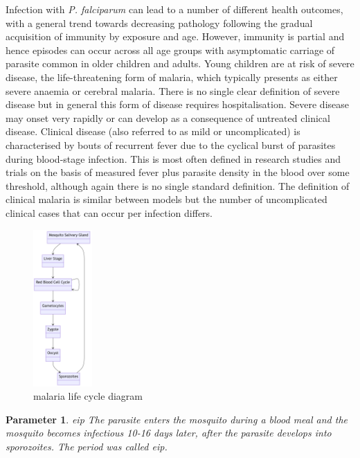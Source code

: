 \documentclass[a4paper, 12pt, twoside]{article}
\newtheorem{parameter}{Parameter}
\begin{document}
Infection with \textit{P. falciparum} can lead to a number of different health outcomes, with a general trend towards decreasing pathology following the gradual acquisition of immunity by exposure and age.
However, immunity is partial and hence episodes can occur across all age groups with asymptomatic carriage of parasite common in older children and adults.
Young children are at risk of severe disease, the life-threatening form of malaria, which typically presents as either severe anaemia or cerebral malaria.
There is no single clear definition of severe disease but in general this form of disease requires hospitalisation.
Severe disease may onset very rapidly or can develop as a consequence of untreated clinical disease.
Clinical disease (also referred to as mild or uncomplicated) is characterised by bouts of recurrent fever due to the cyclical burst of parasites during blood-stage infection.
This is most often defined in research studies and trials on the basis of measured fever plus parasite density in the blood over some threshold, although again there is no single standard definition.
The definition of clinical malaria is similar between models but the number of uncomplicated clinical cases that can occur per infection differs.

\begin{figure}[htpb]
  \centering
  \includegraphics[width=0.2\textwidth]{malaria-life-cycle-diagram}
  \caption{malaria life cycle diagram}
  \label{fig:malaria-life-cycle-diagram}
\end{figure}

\begin{parameter}{\gls{eip}}
The parasite enters the mosquito during a blood meal and the mosquito becomes infectious 10-16 days later, after the parasite develops into sporozoites.
The period was called \gls{eip}. 
\end{parameter}
\end{document}

